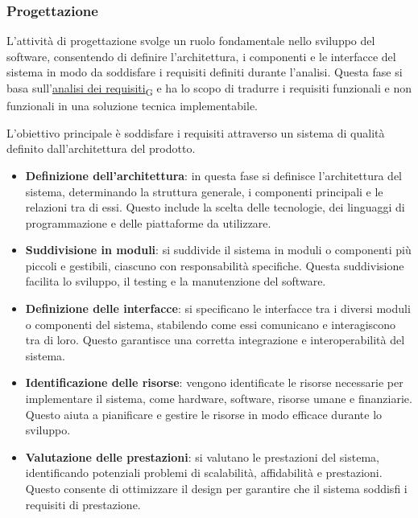 \subsubsection{Progettazione}
L'attività di progettazione svolge un ruolo fondamentale nello sviluppo del software, consentendo di definire l'architettura, i componenti e le interfacce del sistema in modo da soddisfare i requisiti definiti durante l'analisi.  Questa fase si basa sull'\href{https://7last.github.io/docs/rtb/documentazione-interna/glossario\#analisi-dei-requisiti}{analisi dei requisiti\textsubscript{G}} e ha lo scopo di tradurre i requisiti funzionali e non funzionali in una soluzione tecnica implementabile.

L'obiettivo principale è soddisfare i requisiti attraverso un sistema di qualità definito dall'architettura del prodotto.
\begin{itemize}
	\item \textbf{Definizione dell'architettura}: in questa fase si definisce l'architettura del sistema, determinando la struttura generale, i componenti principali e le relazioni tra di essi. Questo include la scelta delle tecnologie, dei linguaggi di programmazione e delle piattaforme da utilizzare.
	\item \textbf{Suddivisione in moduli}: si suddivide il sistema in moduli o componenti più piccoli e gestibili, ciascuno con responsabilità specifiche. Questa suddivisione facilita lo sviluppo, il testing e la manutenzione del software.
	\item \textbf{Definizione delle interfacce}: si specificano le interfacce tra i diversi moduli o componenti del sistema, stabilendo come essi comunicano e interagiscono tra di loro. Questo garantisce una corretta integrazione e interoperabilità del sistema.
	\item \textbf{Identificazione delle risorse}: vengono identificate le risorse necessarie per implementare il sistema, come hardware, software, risorse umane e finanziarie. Questo aiuta a pianificare e gestire le risorse in modo efficace durante lo sviluppo.
	\item \textbf{Valutazione delle prestazioni}: si valutano le prestazioni del sistema, identificando potenziali problemi di scalabilità, affidabilità e prestazioni. Questo consente di ottimizzare il design per garantire che il sistema soddisfi i requisiti di prestazione.
\end{itemize}

